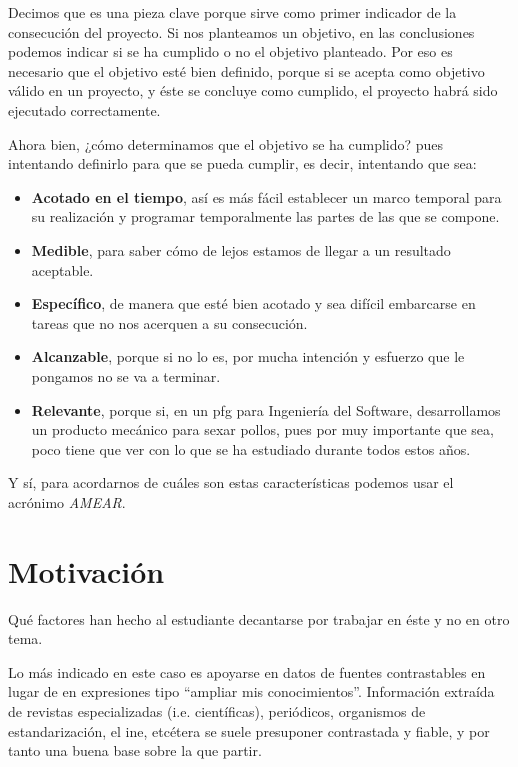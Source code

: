 Decimos que es una pieza clave porque sirve como primer indicador de la consecución del proyecto. Si nos planteamos un objetivo, en las conclusiones podemos indicar si se ha cumplido o no el objetivo planteado. Por eso es necesario que el objetivo esté bien definido, porque si se acepta como objetivo válido en un proyecto, y éste se concluye como cumplido, el proyecto habrá sido ejecutado correctamente.

Ahora bien, ¿cómo determinamos que el objetivo se ha cumplido? pues intentando definirlo para que se pueda cumplir, es decir, intentando que sea:

\begin{itemize}
    \item \textbf{Acotado en el tiempo}, así es más fácil establecer un marco temporal para su realización y programar temporalmente las partes de las que se compone.
    \item \textbf{Medible}, para saber cómo de lejos estamos de llegar a un resultado aceptable.
    \item \textbf{Específico}, de manera que esté bien acotado y sea difícil embarcarse en tareas que no nos acerquen a su consecución.
    \item \textbf{Alcanzable}, porque si no lo es, por mucha intención y esfuerzo que le pongamos no se va a terminar.
    \item \textbf{Relevante}, porque si, en un \gls{pfg} para Ingeniería del Software, desarrollamos un producto mecánico para sexar pollos, pues por muy importante que sea, poco tiene que ver con lo que se ha estudiado durante todos estos años.
\end{itemize}

Y sí, para acordarnos de cuáles son estas características podemos usar el acrónimo \textit{AMEAR}.

\section{Motivación}

Qué factores han hecho al estudiante decantarse por trabajar en éste y no en otro tema.

Lo más indicado en este caso es apoyarse en datos de fuentes contrastables en lugar de en expresiones tipo ``ampliar mis conocimientos''. Información extraída de revistas especializadas (i.e. científicas), periódicos, organismos de estandarización, el \gls{ine}, etcétera se suele presuponer contrastada y fiable, y por tanto una buena base sobre la que partir.


